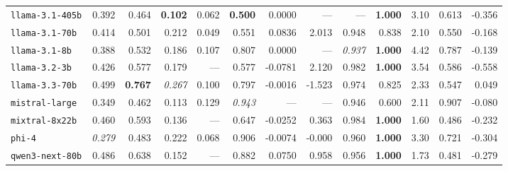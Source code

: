 \begin{table}[t]
{\begin{tabular}{l rrrrrrrrrrrr}
\texttt{llama{-}3.1{-}405b} & 0.392 & 0.464 & \textbf{0.102} & 0.062 & \textbf{0.500} & 0.0000 & --- & --- & \textbf{1.000} & 3.10 & 0.613 & -0.356 \\
\texttt{llama{-}3.1{-}70b} & 0.414 & 0.501 & 0.212 & 0.049 & 0.551 & 0.0836 & 2.013 & 0.948 & 0.838 & 2.10 & 0.550 & -0.168 \\
\texttt{llama{-}3.1{-}8b} & 0.388 & 0.532 & 0.186 & 0.107 & 0.807 & 0.0000 & --- & \textit{0.937} & \textbf{1.000} & 4.42 & 0.787 & -0.139 \\
\texttt{llama{-}3.2{-}3b} & 0.426 & 0.577 & 0.179 & --- & 0.577 & -0.0781 & 2.120 & 0.982 & \textbf{1.000} & 3.54 & 0.586 & -0.558 \\
\texttt{llama{-}3.3{-}70b} & 0.499 & \textbf{0.767} & \textit{0.267} & 0.100 & 0.797 & -0.0016 & -1.523 & 0.974 & 0.825 & 2.33 & 0.547 & 0.049 \\
\texttt{mistral{-}large} & 0.349 & 0.462 & 0.113 & 0.129 & \textit{0.943} & --- & --- & 0.946 & 0.600 & 2.11 & 0.907 & -0.080 \\
\texttt{mixtral{-}8x22b} & 0.460 & 0.593 & 0.136 & --- & 0.647 & -0.0252 & 0.363 & 0.984 & \textbf{1.000} & 1.60 & 0.486 & -0.232 \\
\texttt{phi{-}4} & \textit{0.279} & 0.483 & 0.222 & 0.068 & 0.906 & -0.0074 & -0.000 & 0.960 & \textbf{1.000} & 3.30 & 0.721 & -0.304 \\
\texttt{qwen3{-}next{-}80b} & 0.486 & 0.638 & 0.152 & --- & 0.882 & 0.0750 & 0.958 & 0.956 & \textbf{1.000} & 1.73 & 0.481 & -0.279 \\
\bottomrule
\end{tabular}}
\end{table}

